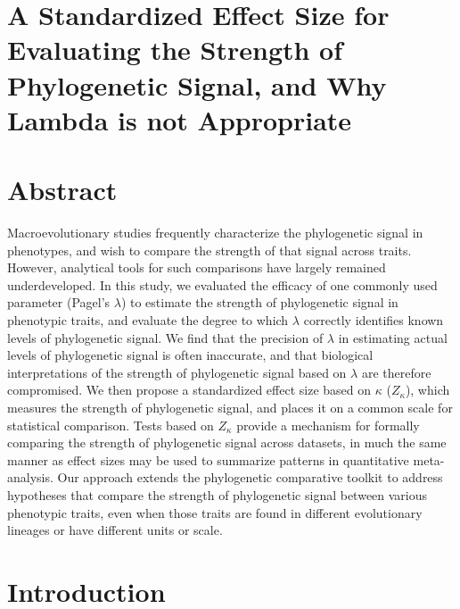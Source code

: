 \documentclass[]{article}
\author{}
\date{\vspace{-2.5em}}
\begin{document}
\hypertarget{a-standardized-effect-size-for-evaluating-the-strength-of-phylogenetic-signal-and-why-lambda-is-not-appropriate}{%
\section{A Standardized Effect Size for Evaluating the Strength of
Phylogenetic Signal, and Why Lambda is not
Appropriate}\label{a-standardized-effect-size-for-evaluating-the-strength-of-phylogenetic-signal-and-why-lambda-is-not-appropriate}}

\hfill\break

\hypertarget{abstract}{%
\section{Abstract}\label{abstract}}

Macroevolutionary studies frequently characterize the phylogenetic
signal in phenotypes, and wish to compare the strength of that signal
across traits. However, analytical tools for such comparisons have
largely remained underdeveloped. In this study, we evaluated the
efficacy of one commonly used parameter (Pagel's \(\lambda\)) to
estimate the strength of phylogenetic signal in phenotypic traits, and
evaluate the degree to which \(\lambda\) correctly identifies known
levels of phylogenetic signal. We find that the precision of \(\lambda\)
in estimating actual levels of phylogenetic signal is often inaccurate,
and that biological interpretations of the strength of phylogenetic
signal based on \(\lambda\) are therefore compromised. We then propose a
standardized effect size based on \(\kappa\) (\(Z_\kappa\)), which
measures the strength of phylogenetic signal, and places it on a common
scale for statistical comparison. Tests based on \(Z_\kappa\) provide a
mechanism for formally comparing the strength of phylogenetic signal
across datasets, in much the same manner as effect sizes may be used to
summarize patterns in quantitative meta-analysis. Our approach extends
the phylogenetic comparative toolkit to address hypotheses that compare
the strength of phylogenetic signal between various phenotypic traits,
even when those traits are found in different evolutionary lineages or
have different units or scale.

\newpage

\hypertarget{introduction}{%
\section{Introduction}\label{introduction}}
\end{document}
